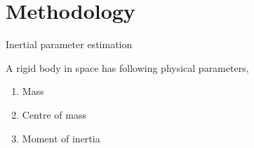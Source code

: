 \section{Methodology}

\begin{frame}{Inertial parameter estimation}
	
	A rigid body in space has following physical parameters,

    \begin{enumerate}
        \item
        Mass
        \pause

        \item
        Centre of mass
        \pause
        
         \item
        Moment of inertia
    \end{enumerate}

\end{frame}

